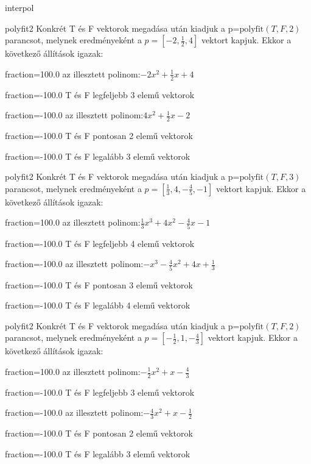 \documentclass[12pt]{article}
\begin{document}
\begin{quiz}{interpol}
\begin{multi}[multiple]{polyfit2}
Konkrét T és F vektorok megadása után kiadjuk a p=$\mathrm{polyfit}(T,F,2)$
parancsot, melynek eredményeként a $p=\left[-2,\frac{1}{2},4\right]$ vektort kapjuk.
Ekkor a következő állítások igazak:
\item[fraction=100.0] az illesztett polinom:$-2x^2+\frac{1}{2}x+4$
\item[fraction=-100.0]  T és F legfeljebb 3 elemű vektorok
\item[fraction=-100.0]  az illesztett polinom:$4x^2+\frac{1}{2}x-2$
\item[fraction=-100.0]  T és F pontosan 2 elemű vektorok
\item[fraction=-100.0] T és F legalább 3 elemű vektorok
\end{multi}
\begin{multi}[multiple]{polyfit2}
Konkrét T és F vektorok megadása után kiadjuk a p=$\mathrm{polyfit}(T,F,3)$
parancsot, melynek eredményeként a $p=\left[\frac{1}{3},4,-\frac{4}{5},-1\right]$ vektort kapjuk.
Ekkor a következő állítások igazak:
\item[fraction=100.0] az illesztett polinom:$\frac{1}{3}x^3+4x^2-\frac{4}{5}x-1$
\item[fraction=-100.0]  T és F legfeljebb 4 elemű vektorok
\item[fraction=-100.0]  az illesztett polinom:$-x^3-\frac{4}{5}x^2+4x+\frac{1}{3}$
\item[fraction=-100.0]  T és F pontosan 3 elemű vektorok
\item[fraction=-100.0] T és F legalább 4 elemű vektorok
\end{multi}
\begin{multi}[multiple]{polyfit2}
Konkrét T és F vektorok megadása után kiadjuk a p=$\mathrm{polyfit}(T,F,2)$
parancsot, melynek eredményeként a $p=\left[-\frac{1}{2},1,-\frac{4}{3}\right]$ vektort kapjuk.
Ekkor a következő állítások igazak:
\item[fraction=100.0] az illesztett polinom:$-\frac{1}{2}x^2+x-\frac{4}{3}$
\item[fraction=-100.0]  T és F legfeljebb 3 elemű vektorok
\item[fraction=-100.0]  az illesztett polinom:$-\frac{4}{3}x^2+x-\frac{1}{2}$
\item[fraction=-100.0]  T és F pontosan 2 elemű vektorok
\item[fraction=-100.0] T és F legalább 3 elemű vektorok
\end{multi}
\end{quiz}
\end{document}
